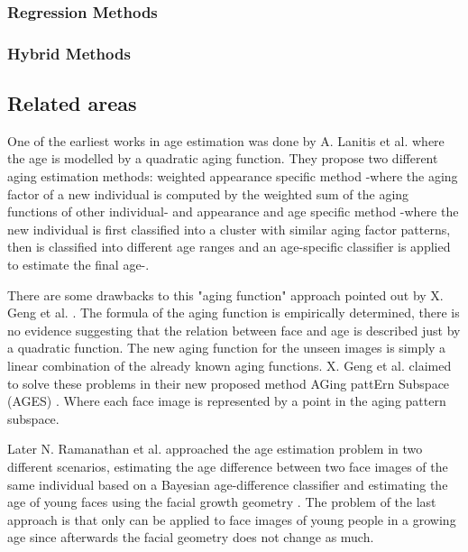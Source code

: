 \subsubsection{Regression Methods}
\subsubsection{Hybrid Methods}

\subsection{Related areas}


One of the earliest works in age estimation was done by A. Lanitis et al. \cite{Lanitis:2004:CDC:2225304.2226166, 791208, 993553} where the age is modelled by a quadratic aging function. They propose two different aging estimation methods: weighted appearance specific method \cite{791208, 993553}  -where the aging factor of a new individual is computed by the weighted sum of the aging functions of other individual- and appearance and age specific method \cite{Lanitis:2004:CDC:2225304.2226166} -where the new individual is first classified into a cluster with similar aging factor patterns, then is classified into different age ranges and an age-specific classifier is applied to estimate the final age-. 

There are some drawbacks to this "aging function" approach pointed out by X. Geng et al. \cite{Geng:2006:LFA:1180639.1180711}. The formula of the aging function is empirically determined, there is no evidence suggesting that the relation between face and age is described just by a quadratic function. The new aging function for the unseen images is simply a linear combination of the already known aging functions. X. Geng et al. claimed to solve these problems in their new proposed method AGing pattErn Subspace (AGES) \cite{Geng:2006:LFA:1180639.1180711}. Where each face image is represented by a point in the aging pattern subspace.

Later N. Ramanathan et al. \cite{1709980, 1640784} approached the age estimation problem in two different scenarios, estimating the age difference between two face images of the same individual based on a Bayesian age-difference classifier \cite{1709980} and estimating the age of young faces using the facial growth geometry \cite{1640784}. The problem of the last approach is that only can be applied to face images of young people in a growing age since afterwards the facial geometry does not change as much.

